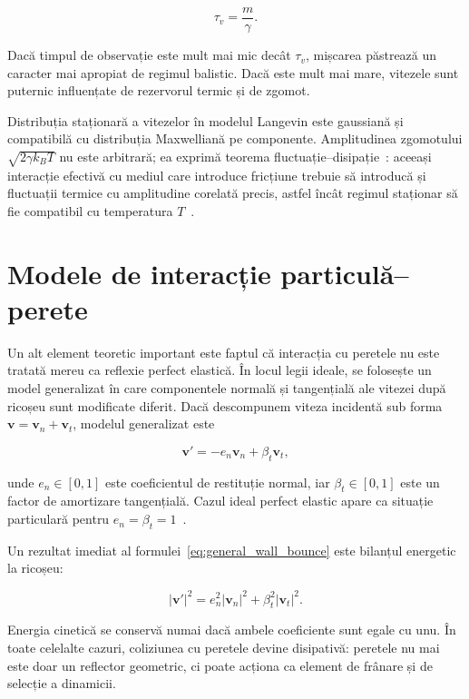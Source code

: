 \documentclass[12pt,openright,twoside]{book}
\begin{document}
\begin{equation}
    \tau_v = \frac{m}{\gamma}.
\end{equation}

Dacă timpul de observație este mult mai mic decât $\tau_v$, mișcarea păstrează un caracter mai apropiat de regimul balistic. Dacă este mult mai mare, vitezele sunt puternic influențate de rezervorul termic și de zgomot.

Distribuția staționară a vitezelor în modelul Langevin este gaussiană și compatibilă cu distribuția Maxwelliană pe componente. Amplitudinea zgomotului $\sqrt{2\gamma k_B T}$ nu este arbitrară; ea exprimă teorema fluctuație--disipație~\cite{kubo1966,marconi2008}: aceeași interacție efectivă cu mediul care introduce fricțiune trebuie să introducă și fluctuații termice cu amplitudine corelată precis, astfel încât regimul staționar să fie compatibil cu temperatura $T$~\cite{gardiner2009}.

\section{Modele de interacție particulă--perete}

Un alt element teoretic important este faptul că interacția cu peretele nu este tratată mereu ca reflexie perfect elastică. În locul legii ideale, se folosește un model generalizat în care componentele normală și tangențială ale vitezei după ricoșeu sunt modificate diferit. Dacă descompunem viteza incidentă sub forma $\mathbf{v}=\mathbf{v}_n+\mathbf{v}_t$, modelul generalizat este

\begin{equation}
    \mathbf{v}' = -e_n\mathbf{v}_n + \beta_t \mathbf{v}_t,
    \label{eq:general_wall_bounce}
\end{equation}

unde $e_n \in [0,1]$ este coeficientul de restituție normal, iar $\beta_t \in [0,1]$ este un factor de amortizare tangențială. Cazul ideal perfect elastic apare ca situație particulară pentru $e_n=\beta_t=1$~\cite{cercignani1971,kogan1969}.

Un rezultat imediat al formulei~\eqref{eq:general_wall_bounce} este bilanțul energetic la ricoșeu:

\begin{equation}
    |\mathbf{v}'|^2 = e_n^2 |\mathbf{v}_n|^2 + \beta_t^2 |\mathbf{v}_t|^2.
\end{equation}

Energia cinetică se conservă numai dacă ambele coeficiente sunt egale cu unu. În toate celelalte cazuri, coliziunea cu peretele devine disipativă: peretele nu mai este doar un reflector geometric, ci poate acționa ca element de frânare și de selecție a dinamicii.
\end{document}
